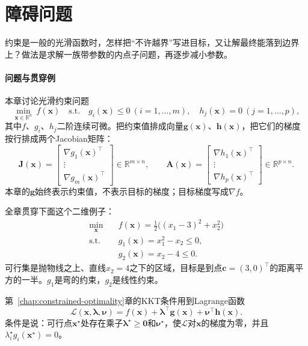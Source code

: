 \section{障碍问题}
\label{sec:nlipm-barrier}

约束是一般的光滑函数时，怎样把“不许越界”写进目标，又让解最终能落到边界上？做法是求解一族带参数的内点子问题，再逐步减小参数。

\paragraph{问题与贯穿例}
本章讨论光滑约束问题
\begin{equation}
 \min_{\bm{x}\in\mathbb{R}^n}\ f(\bm{x})\quad\text{s.t.}\quad g_i(\bm{x})\leq0\ (i=1,\ldots,m),\quad h_j(\bm{x})=0\ (j=1,\ldots,p),
 \label{eq:nlipm-problem}
\end{equation}
其中$f$、$g_i$、$h_j$二阶连续可微。把约束值排成向量$\bm{g}(\bm{x})$、$\bm{h}(\bm{x})$，把它们的梯度按行排成两个Jacobian矩阵：
\begin{equation}
 \bm{J}(\bm{x})=\begin{bmatrix}\nabla g_1(\bm{x})^\top\\\vdots\\\nabla g_m(\bm{x})^\top\end{bmatrix}\in\mathbb{R}^{m\times n},\qquad
 \bm{A}(\bm{x})=\begin{bmatrix}\nabla h_1(\bm{x})^\top\\\vdots\\\nabla h_p(\bm{x})^\top\end{bmatrix}\in\mathbb{R}^{p\times n}.
 \label{eq:nlipm-jacobians}
\end{equation}
本章的$\bm{g}$始终表示约束值，不表示目标的梯度；目标梯度写成$\nabla f$。

全章贯穿下面这个二维例子：
\begin{equation}
 \begin{aligned}
 \min_{\bm{x}}\quad&f(\bm{x})=\tfrac12\bigl((x_1-3)^2+x_2^2\bigr)\\
 \text{s.t.}\quad&g_1(\bm{x})=x_1^2-x_2\leq0,\\
 &g_2(\bm{x})=x_2-4\leq0.
 \end{aligned}
 \label{eq:nlipm-running}
\end{equation}
可行集是抛物线之上、直线$x_2=4$之下的区域，目标是到点$\bm{c}=(3,0)^\top$的距离平方的一半。$g_1$是弯的约束，$g_2$是线性约束。

第~\ref{chap:constrained-optimality}章的KKT条件用到Lagrange函数
\begin{equation}
 \mathcal{L}(\bm{x},\bm{\lambda},\bm{\nu})=f(\bm{x})+\bm{\lambda}^\top\bm{g}(\bm{x})+\bm{\nu}^\top\bm{h}(\bm{x}).
 \label{eq:nlipm-lagrangian}
\end{equation}
条件是说：可行点$\bm{x}^\star$处存在乘子$\bm{\lambda}^\star\geq\bm{0}$和$\bm{\nu}^\star$，使$\mathcal{L}$对$\bm{x}$的梯度为零，并且$\lambda_i^\star g_i(\bm{x}^\star)=0$。

